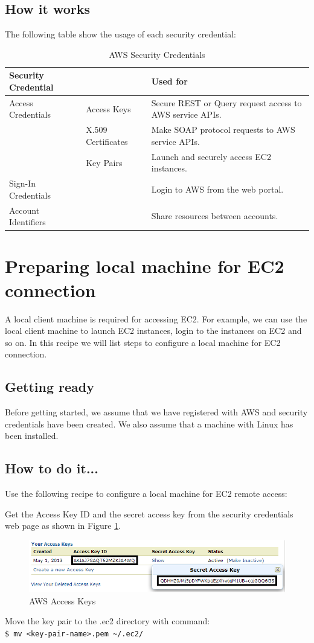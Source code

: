 \subsection*{How it works}
The following table show the usage of each security credential:
\begin{table}[ht]
  \footnotesize
  \centering
  \begin{tabular}{lll}
    \toprule
    \textbf{Security Credential} & & \textbf{Used for} \\ \midrule
    Access Credentials & Access Keys & Secure REST or Query request access to AWS service APIs. \\
    & X.509 Certificates & Make SOAP protocol requests to AWS service APIs. \\
    & Key Pairs & Launch and securely access EC2 instances. \\
    Sign-In Credentials  & & Login to AWS from the web portal. \\
    Account Identifiers  & & Share resources between accounts. \\ \bottomrule
  \end{tabular}
  \caption{AWS Security Credentials}\label{tbl:awssecurity}
\end{table}

\section{Preparing local machine for EC2 connection}
A local client machine is required for accessing EC2. For example, we can use the local client machine to launch EC2 instances, login to the instances on EC2 and so on. In this recipe we will list steps to configure a local machine for EC2 connection.
\subsection*{Getting ready}
Before getting started, we assume that we have registered with AWS and security credentials have been created. We also assume that a machine with Linux has been installed.
\subsection*{How to do it...}
Use the following recipe to configure a local machine for EC2 remote access:

Get the Access Key ID and the secret access key from the security credentials web page as shown in Figure \ref{fig:aws.access.keys}.
\begin{figure}[ht]
  \centering
  \includegraphics[width=.8\textwidth]{figs/5163os_08_15.png}
  \caption{AWS Access Keys}\label{fig:aws.access.keys}
\end{figure} 
Move the key pair to the .ec2 directory with command: \\
\verb|$ mv <key-pair-name>.pem ~/.ec2/|

